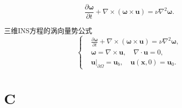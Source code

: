 \documentclass[12pt]{article}
\begin{document}

\begin{equation}
	\frac{\partial \bm{\omega}}{\partial t}+\nabla \times(\bm{\omega} \times \bm{u})=\nu \nabla^{2} \bm{\omega} .
\end{equation}

三维INS方程的涡向量势公式
\begin{equation}
	\left\{\begin{aligned}
		 & \frac{\partial \bm{\omega}}{\partial t}+\nabla \times(\bm{\omega} \times \bm{u})=\nu \nabla^{2} \bm{\omega}, \\
		 & \bm{\omega}=\nabla \times \bm{u}, \quad \nabla \cdot \bm{u}=0,                                               \\
		 & \left.\bm{u}\right|_{\partial \Omega}=\bm{u}_{b}, \quad \bm{u}(\bm{x}, 0)=\bm{u}_{0}.
	\end{aligned}\right.
\end{equation}


\section{C}
\end{document}

